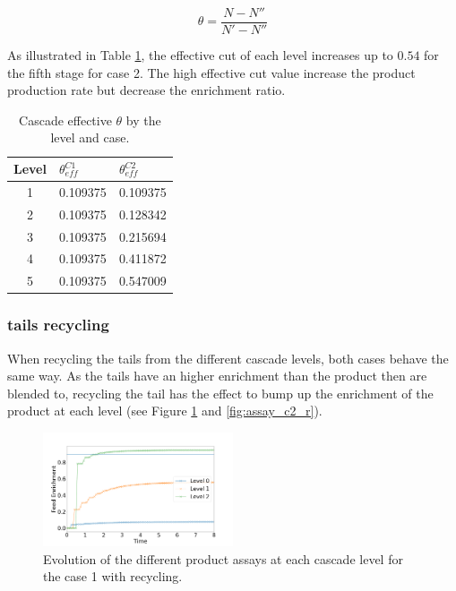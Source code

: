 \documentclass{anstrans}
\begin{document}
\begin{equation}\label{eq:theta_eff}
    \theta = \dfrac{N - N''}{N'-N''}
\end{equation}

As illustrated in Table \ref{tab:cascade_theta}, the effective cut
of each level increases up to $0.54$ for the fifth stage for case 2. The high
effective cut value increase the product production rate but decrease the
enrichment ratio.
\begin{table}[htb]
\centering
\begin{tabular}{cll}
\toprule

Level   &  $\theta_{eff}^{C1}$   & $\theta_{eff}^{C2}$ \\
\midrule
1       & 0.109375               & 0.109375     \\
2       & 0.109375               & 0.128342     \\
3       & 0.109375               & 0.215694     \\
4       & 0.109375               & 0.411872     \\
5       & 0.109375               & 0.547009     \\

\bottomrule
\end{tabular}
  \caption{Cascade effective $\theta$ by the level and case.}
  \label{tab:cascade_theta}
\end{table}

\subsubsection{tails recycling}
When recycling the tails from the different cascade levels, both cases behave
the same way. As the tails have an higher enrichment than the product then are
blended to, recycling the tail has the effect to bump up the enrichment of the
product at each level (see Figure \ref{fig:assay_c1_r} and \ref{fig:assay_c2_r}).

\begin{figure}[ht] %
  \centering
  \includegraphics[width=0.5\textwidth]{assay_case_1_rec.png}
  \caption{Evolution of the different product assays at each cascade level for
  the case 1 with recycling. }\label{fig:assay_c1_r}
\end{figure}
\end{document}
